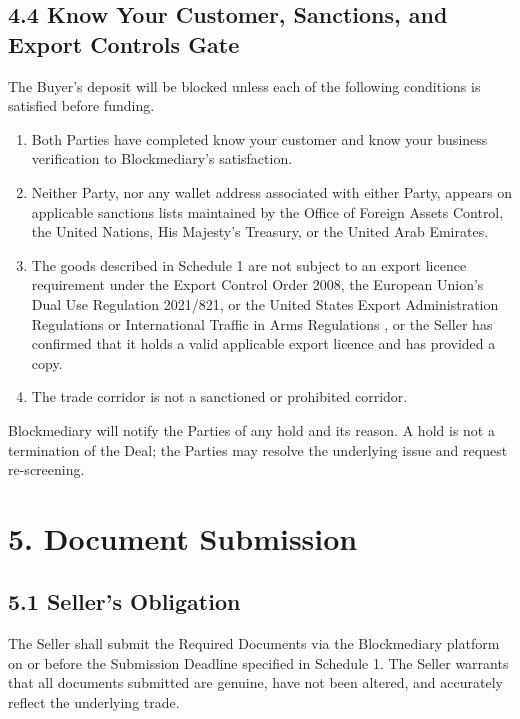 \documentclass[12pt, a4paper]{article}
\begin{document}
\subsection*{4.4 Know Your Customer, Sanctions, and Export Controls Gate}

The Buyer's deposit will be blocked unless each of the following conditions is satisfied
before funding.

\begin{enumerate}[label=(\alph*)]
\item Both Parties have completed know your customer and know your business verification
to Blockmediary's satisfaction.
\item Neither Party, nor any wallet address associated with either Party, appears on
applicable sanctions lists maintained by the Office of Foreign Assets Control, the United
Nations, His Majesty's Treasury, or the United Arab Emirates.
\item The goods described in Schedule 1 are not subject to an export licence requirement
under the Export Control Order 2008, the European Union's Dual Use Regulation 2021/821, or
the United States Export Administration Regulations or International Traffic in Arms
Regulations \citep{ukeco2008, eudualuse2021, usear, usitar}, or the Seller has confirmed
that it holds a valid applicable export licence and has provided a copy.
\item The trade corridor is not a sanctioned or prohibited corridor.
\end{enumerate}

Blockmediary will notify the Parties of any hold and its reason. A hold is not a
termination of the Deal; the Parties may resolve the underlying issue and request
re-screening.

\section*{5. Document Submission}

\subsection*{5.1 Seller's Obligation}

The Seller shall submit the Required Documents via the Blockmediary platform on or before
the Submission Deadline specified in Schedule 1. The Seller warrants that all documents
submitted are genuine, have not been altered, and accurately reflect the underlying trade.
\end{document}
